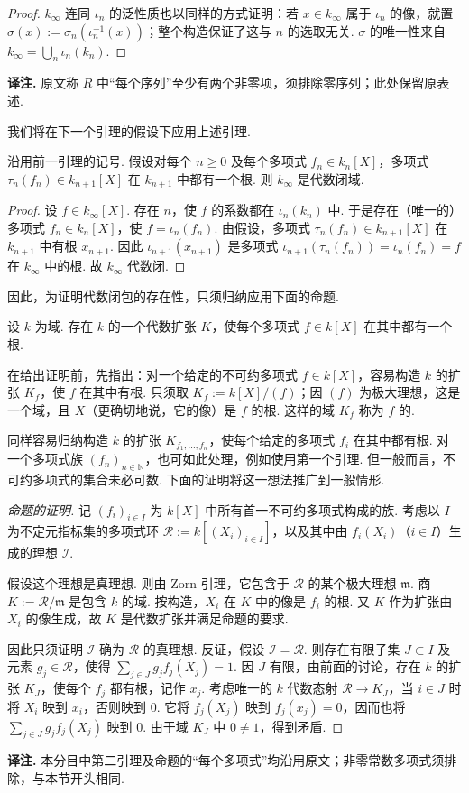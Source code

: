 \begin{proof}
$k_\infty$ 连同 $\iota_n$ 的泛性质也以同样的方式证明：若 $x\in k_\infty$ 属于 $\iota_n$ 的像，就置 $\sigma(x):=\sigma_n(\iota_n^{-1}(x))$；整个构造保证了这与 $n$ 的选取无关. $\sigma$ 的唯一性来自 $k_\infty=\bigcup_n\iota_n(k_n)$.
\end{proof}
\noindent\textbf{译注.} 原文称 $R$ 中``每个序列''至少有两个非零项，须排除零序列；此处保留原表述.

我们将在下一个引理的假设下应用上述引理.
\begin{lemma*}
沿用前一引理的记号. 假设对每个 $n\ge0$ 及每个多项式 $f_n\in k_n[X]$，多项式 $\tau_n(f_n)\in k_{n+1}[X]$ 在 $k_{n+1}$ 中都有一个根. 则 $k_\infty$ 是代数闭域.
\end{lemma*}
\begin{proof}
设 $f\in k_\infty[X]$. 存在 $n$，使 $f$ 的系数都在 $\iota_n(k_n)$ 中. 于是存在（唯一的）多项式 $f_n\in k_n[X]$，使 $f=\iota_n(f_n)$. 由假设，多项式 $\tau_n(f_n)\in k_{n+1}[X]$ 在 $k_{n+1}$ 中有根 $x_{n+1}$. 因此 $\iota_{n+1}(x_{n+1})$ 是多项式 $\iota_{n+1}(\tau_n(f_n))=\iota_n(f_n)=f$ 在 $k_\infty$ 中的根. 故 $k_\infty$ 代数闭.
\end{proof}
因此，为证明代数闭包的存在性，只须归纳应用下面的命题.
\begin{proposition*}
设 $k$ 为域. 存在 $k$ 的一个代数扩张 $K$，使每个多项式 $f\in k[X]$ 在其中都有一个根.
\end{proposition*}
\begin{remark*}[{根域}]
在给出证明前，先指出：对一个给定的不可约多项式 $f\in k[X]$，容易构造 $k$ 的扩张 $K_f$，使 $f$ 在其中有根. 只须取 $K_f:=k[X]/(f)$；因 $(f)$ 为极大理想，这是一个域，且 $X$（更确切地说，它的像）是 $f$ 的根. 这样的域 $K_f$ 称为 $f$ 的.
\end{remark*}
同样容易归纳构造 $k$ 的扩张 $K_{f_1,\ldots,f_n}$，使每个给定的多项式 $f_i$ 在其中都有根. 对一个多项式族 $(f_n)_{n\in\mathbb N}$，也可如此处理，例如使用第一个引理. 但一般而言，不可约多项式的集合未必可数. 下面的证明将这一想法推广到一般情形.
\begin{proof}[命题的证明]
记 $(f_i)_{i\in I}$ 为 $k[X]$ 中所有首一不可约多项式构成的族. 考虑以 $I$ 为不定元指标集的多项式环 $\mathcal R:=k[(X_i)_{i\in I}]$，以及其中由 $f_i(X_i)$（$i\in I$）生成的理想 $\mathcal I$.

假设这个理想是真理想. 则由 Zorn 引理，它包含于 $\mathcal R$ 的某个极大理想 $\mathfrak m$. 商 $K:=\mathcal R/\mathfrak m$ 是包含 $k$ 的域. 按构造，$X_i$ 在 $K$ 中的像是 $f_i$ 的根. 又 $K$ 作为扩张由 $X_i$ 的像生成，故 $K$ 是代数扩张并满足命题的要求.

因此只须证明 $\mathcal I$ 确为 $\mathcal R$ 的真理想. 反证，假设 $\mathcal I=\mathcal R$. 则存在有限子集 $J\subset I$ 及元素 $g_j\in\mathcal R$，使得 $\sum_{j\in J}g_jf_j(X_j)=1$. 因 $J$ 有限，由前面的讨论，存在 $k$ 的扩张 $K_J$，使每个 $f_j$ 都有根，记作 $x_j$. 考虑唯一的 $k$ 代数态射 $\mathcal R\to K_J$，当 $i\in J$ 时将 $X_i$ 映到 $x_i$，否则映到 $0$. 它将 $f_j(X_j)$ 映到 $f_j(x_j)=0$，因而也将 $\sum_{j\in J}g_jf_j(X_j)$ 映到 $0$. 由于域 $K_J$ 中 $0\ne1$，得到矛盾.
\end{proof}
\noindent\textbf{译注.} 本分目中第二引理及命题的``每个多项式''均沿用原文；非零常数多项式须排除，与本节开头相同.

